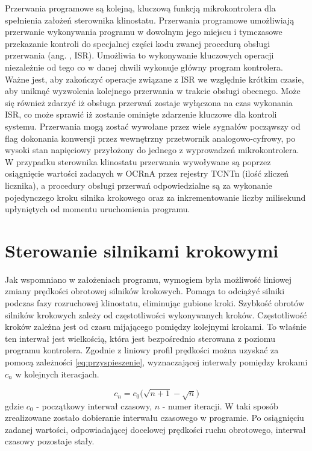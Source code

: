 Przerwania programowe są kolejną, kluczową funkcją mikrokontrolera dla spełnienia założeń sterownika klinostatu. Przerwania programowe umożliwiają przerwanie wykonywania programu w dowolnym jego miejscu i tymczasowe przekazanie kontroli do specjalnej części kodu zwanej procedurą obsługi przerwania (ang. , ISR). Umożliwia to wykonywanie kluczowych operacji niezależnie od tego co w danej chwili wykonuje główny program kontrolera. Ważne jest, aby zakończyć operacje związane z ISR we względnie krótkim czasie, aby uniknąć wyzwolenia kolejnego przerwania w trakcie obsługi obecnego. Może się również zdarzyć iż obsługa przerwań zostaje wyłączona na czas wykonania ISR, co może sprawić iż zostanie ominięte zdarzenie kluczowe dla kontroli systemu. Przerwania mogą zostać wywołane przez wiele sygnałów począwszy od flag dokonania konwersji przez wewnętrzny przetwornik analogowo-cyfrowy, po wysoki stan napięciowy przyłożony do jednego z wyprowadzeń mikrokontrolera. W przypadku sterownika klinostatu przerwania wywoływane są poprzez osiągnięcie wartości zadanych \linebreak w OCRnA przez rejestry TCNTn (ilość zliczeń licznika), a procedury obsługi przerwań odpowiedzialne są za wykonanie pojedynczego kroku silnika krokowego oraz za inkrementowanie liczby milisekund upłyniętych od momentu uruchomienia programu.

\section{Sterowanie silnikami krokowymi}

Jak wspomniano w założeniach programu, wymogiem była możliwość liniowej zmiany prędkości obrotowej silników krokowych. Pomaga to odciążyć silniki podczas fazy rozruchowej klinostatu, eliminując gubione kroki. Szybkość obrotów silników krokowych zależy od częstotliwości wykonywanych kroków. Częstotliwość kroków zależna jest od czasu mijającego pomiędzy kolejnymi krokami. To właśnie ten interwał jest wielkością, która jest bezpośrednio sterowana z poziomu programu kontrolera. Zgodnie z \cite{bib:krokowe_przyspieszenie} liniowy profil prędkości można uzyskać za pomocą zależności \ref{eq:przyspieszenie}, wyznaczającej interwały pomiędzy krokami $c_n$ w kolejnych iteracjach.

\begin{equation}\label{eq:przyspieszenie}
	c_n = c_0 \big(\sqrt{n+1} - \sqrt{n} \big)
\end{equation}
gdzie $c_0$ - początkowy interwał czasowy, $n$ - numer iteracji. W taki sposób zrealizowane zostało dobieranie interwału czasowego w programie. Po osiągnięciu zadanej wartości, odpowiadającej docelowej prędkości ruchu obrotowego, interwał czasowy pozostaje stały.


